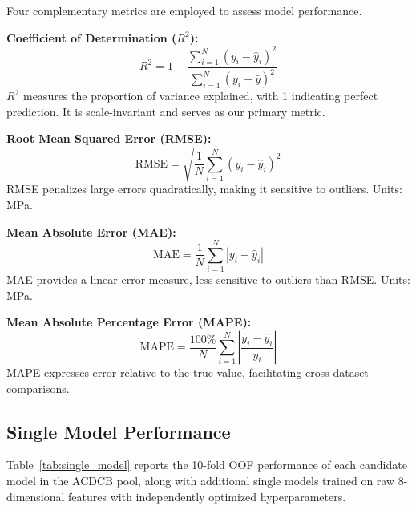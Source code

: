 \documentclass[journal]{IEEEtran}
\begin{document}
Four complementary metrics are employed to assess model performance.

\textbf{Coefficient of Determination ($R^2$):}
\begin{equation}
R^2 = 1 - \frac{\sum_{i=1}^{N} (y_i - \hat{y}_i)^2}{\sum_{i=1}^{N} (y_i - \bar{y})^2}
\end{equation}
$R^2$ measures the proportion of variance explained, with 1 indicating perfect prediction. It is scale-invariant and serves as our primary metric.

\textbf{Root Mean Squared Error (RMSE):}
\begin{equation}
\text{RMSE} = \sqrt{\frac{1}{N} \sum_{i=1}^{N} (y_i - \hat{y}_i)^2}
\end{equation}
RMSE penalizes large errors quadratically, making it sensitive to outliers. Units: MPa.

\textbf{Mean Absolute Error (MAE):}
\begin{equation}
\text{MAE} = \frac{1}{N} \sum_{i=1}^{N} |y_i - \hat{y}_i|
\end{equation}
MAE provides a linear error measure, less sensitive to outliers than RMSE. Units: MPa.

\textbf{Mean Absolute Percentage Error (MAPE):}
\begin{equation}
\text{MAPE} = \frac{100\%}{N} \sum_{i=1}^{N} \left|\frac{y_i - \hat{y}_i}{y_i}\right|
\end{equation}
MAPE expresses error relative to the true value, facilitating cross-dataset comparisons.

\subsection{Single Model Performance}

Table~\ref{tab:single_model} reports the 10-fold OOF performance of each candidate model in the ACDCB pool, along with additional single models trained on raw 8-dimensional features with independently optimized hyperparameters.
\end{document}

